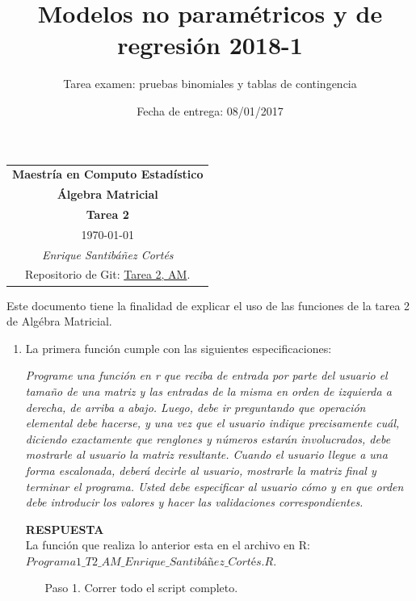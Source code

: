 \documentclass[11pt,letterpaper]{article}
\title{Modelos no paramétricos y de regresión 2018-1}
\author{Tarea examen: pruebas binomiales y tablas de contingencia}
\date{Fecha de entrega: 08/01/2017}
\newcommand{\res}{\textbf{RESPUESTA}\\}
\begin{document}
\begin{table}[ht]
\centering
\begin{tabular}{c}
\textbf{Maestría en Computo Estadístico}\\
\textbf{Álgebra Matricial} \\
\textbf{Tarea 2}\\
\today \\
\emph{Enrique Santibáñez Cortés}\\
Repositorio de Git: \href{https://github.com/Enriquesec/Algebra_matricial/tree/feature/tareas/tareas/Tarea_2}{Tarea 2, AM}.
\end{tabular}
\end{table}
Este documento tiene la finalidad de explicar el uso de las funciones de la tarea 2 de Algébra Matricial. 

\begin{enumerate}
\item La primera función cumple con las siguientes especificaciones:

\textit{Programe una función en r que reciba de entrada por parte del usuario el tamaño de una matriz y las entradas de la misma en orden de izquierda a derecha, de arriba a abajo. Luego, debe ir preguntando que operación elemental debe hacerse, y una vez que el usuario indique precisamente cuál, diciendo exactamente que renglones y números estarán involucrados, debe mostrarle al usuario la matriz resultante.  Cuando el usuario llegue a una forma escalonada, deberá decirle al usuario, mostrarle la matriz final y terminar el programa. Usted debe especificar al usuario cómo y en que orden debe introducir los valores y hacer las validaciones correspondientes.
}

\res
La función que realiza lo anterior esta en el archivo en R: \\$Programa1\_T2\_AM\_Enrique\_Santibáñez\_Cortés.R$.
\begin{itemize}
\item[Paso 1.] Correr todo el script completo.


\end{itemize}
\end{enumerate}
\end{document}

